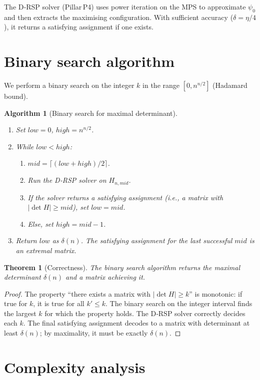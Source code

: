 \documentclass[11pt,a4paper]{article}
\newtheorem{theorem}{Theorem}[section]
\newtheorem{algorithm}{Algorithm}[section]
\begin{document}
The D‑RSP solver (Pillar P4) uses power iteration on the MPS to approximate $\psi_0$ and then extracts the maximising configuration. With sufficient accuracy ($\delta = \eta/4$), it returns a satisfying assignment if one exists.

\section{Binary search algorithm}

We perform a binary search on the integer $k$ in the range $[0, n^{n/2}]$ (Hadamard bound).

\begin{algorithm}[Binary search for maximal determinant]\label{alg:binary}
\begin{enumerate}
\item Set $low = 0$, $high = n^{n/2}$.
\item While $low < high$:
   \begin{enumerate}
   \item $mid = \lceil (low+high)/2 \rceil$.
   \item Run the D‑RSP solver on $H_{n,mid}$.
   \item If the solver returns a satisfying assignment (i.e., a matrix with $|\det H| \ge mid$), set $low = mid$.
   \item Else, set $high = mid-1$.
   \end{enumerate}
\item Return $low$ as $\delta(n)$. The satisfying assignment for the last successful $mid$ is an extremal matrix.
\end{enumerate}
\end{algorithm}

\begin{theorem}[Correctness]\label{thm:correct}
The binary search algorithm returns the maximal determinant $\delta(n)$ and a matrix achieving it.
\end{theorem}
\begin{proof}
The property “there exists a matrix with $|\det H| \ge k$” is monotonic: if true for $k$, it is true for all $k' \le k$. The binary search on the integer interval finds the largest $k$ for which the property holds. The D‑RSP solver correctly decides each $k$. The final satisfying assignment decodes to a matrix with determinant at least $\delta(n)$; by maximality, it must be exactly $\delta(n)$.
\end{proof}

\section{Complexity analysis}
\end{document}

